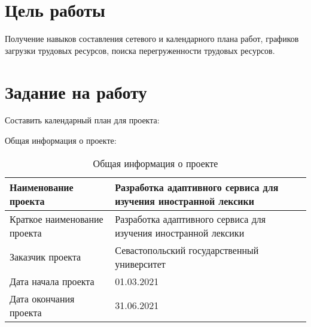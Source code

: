 \documentclass[a4paper,14pt]{extarticle}
\begin{document}


\section{Цель работы}
Получение навыков составления сетевого и календарного плана работ, графиков
загрузки трудовых ресурсов, поиска перегруженности трудовых ресурсов.

\section{Задание на работу}
Составить календарный план для проекта:

Общая информация о проекте:
\begin{table}[H]
    \caption{Общая информация о проекте}
    \begin{tabular}{ | p{5.5cm} | p{11cm} | }
        \hline
        Наименование проекта & Разработка адаптивного сервиса для изучения иностранной лексики \\ \hline
        Краткое наименование проекта & Разработка адаптивного сервиса для изучения иностранной лексики \\ \hline
        Заказчик проекта & Севастопольский государственный университет \\ \hline
        Дата начала проекта & 01.03.2021 \\ \hline
        Дата окончания проекта & 31.06.2021 \\ \hline
    \end{tabular}
\end{table}
\end{document}
